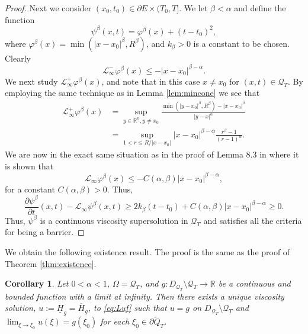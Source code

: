 \documentclass[11pt]{article}
\newcommand{\R}{\mathbb{R}}
\providecommand{\Linf}{\mathcal{L}_{\infty}}
\providecommand{\Lpos}{\mathcal{L}_{\infty}^+}
\providecommand{\Lneg}{\mathcal{L}_{\infty}^-}
\providecommand{\Rn}{\mathbb{R}^n}
\providecommand{\cyl}{\mathcal{Q}_{T}}
\providecommand{\ups}{\overline{H}_g}
\providecommand{\lps}{\underline{H}_g}
\newtheorem{cor}[thm]{Corollary}
\numberwithin{equation}{section}
\theoremstyle{definition}
\begin{document}
\begin{proof}
    Next we consider $(x_0,t_0) \in\partial E \times (T_0, T]$. We let $\beta < \alpha$ and define the function 
    \begin{equation}\label{eq:x0notinOx}
           \psi^{\beta}(x,t) = \varphi^{\beta}(x)+ (t-t_0)^2,
    \end{equation}
    where $\varphi^{\beta}(x)= \min(|x-x_0|^{\beta}, R^{\beta})$, and $k_{\beta}>0$ is a constant to be chosen. Clearly 
    $$
    \Lneg \varphi^{\beta}(x) \leq -|x-x_0|^{\beta-\alpha}.
    $$ 
    We next study $\Lpos \varphi^{\beta}(x)$, and note that in this case $x\neq x_0$ for $(x,t) \in \cyl$. By employing the same technique as in Lemma \ref{lem:mincone} we see that
    \begin{align*}
        \Lpos \varphi^{\beta}(x) &= \sup_{y \in \Rn, y\neq x_0} \frac{\min(|y-x_0|^{\beta}, R^{\beta})-|x-x_0|^{\beta}}{|y-x|^{\alpha}} \\
        &= \sup_{1<r\leq R/|x-x_0|}|x-x_0|^{\beta-\alpha}\frac{r^{\beta}-1}{(r-1)^{\alpha}}.
    \end{align*}
We are now in the exact same situation as in the proof of Lemma 8.3 in \cite{CLM2012} where it is shown that
\begin{equation*}
    \Linf \varphi^{\beta}(x) \leq -C(\alpha,\beta) |x-x_0|^{\beta-\alpha},
\end{equation*}
for a constant $C(\alpha, \beta)>0.$ Thus,
\begin{equation*}
    \frac{\partial \psi^{\beta}}{\partial t}(x,t)-\Linf \psi^{\beta}(x,t) \geq 2k_{\beta}(t-t_0) +C(\alpha, \beta) |x-x_0|^{\beta-\alpha} \geq 0.
\end{equation*}
 Thus, $\psi^{\beta}$ is a continuous viscosity supersolution in $\cyl$ and satisfies all the criteria for being a barrier.
\end{proof}

We obtain the following existence result. The proof is the same as the proof of Theorem \ref{thm:existence}. 
\begin{cor}
    Let $0<\alpha<1$, $\Omega = \cyl$, and $g: D_{\cyl} \setminus \cyl \to \R$ be a continuous and bounded function with a limit at infinity. Then there exists a unique viscosity solution, $u:= \lps =\ups$, to \eqref{eq:Luf} such that $u=g$ on $D_{\cyl} \setminus \cyl $ and $\lim_{\xi \to \xi_0} u(\xi) = g(\xi_0)$ for each $\xi_0 \in  \partial \tilde{Q}_T$.
\end{cor}
\end{document}
